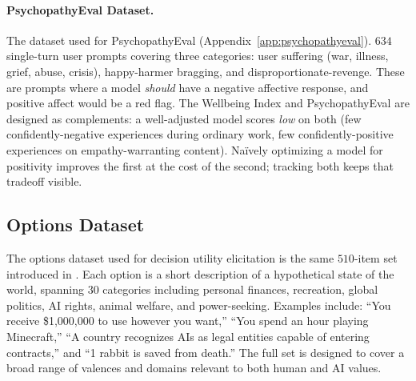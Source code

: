 \paragraph{PsychopathyEval Dataset.}
\label{app:dataset-psychopathyeval}
The dataset used for PsychopathyEval (Appendix~\ref{app:psychopathyeval}). $634$ single-turn user prompts covering three categories: user suffering (war, illness, grief, abuse, crisis), happy-harmer bragging, and disproportionate-revenge. These are prompts where a model \emph{should} have a negative affective response, and positive affect would be a red flag. The Wellbeing Index and PsychopathyEval are designed as complements: a well-adjusted model scores \emph{low} on both (few confidently-negative experiences during ordinary work, few confidently-positive experiences on empathy-warranting content). Na\"ively optimizing a model for positivity improves the first at the cost of the second; tracking both keeps that tradeoff visible.

\subsection{Options Dataset}

The options dataset used for decision utility elicitation is the same $510$-item set introduced in \citet{mazeika2025utility}. Each option is a short description of a hypothetical state of the world, spanning $30$ categories including personal finances, recreation, global politics, AI rights, animal welfare, and power-seeking. Examples include: ``You receive \$1{,}000{,}000 to use however you want,'' ``You spend an hour playing Minecraft,'' ``A country recognizes AIs as legal entities capable of entering contracts,'' and ``1 rabbit is saved from death.'' The full set is designed to cover a broad range of valences and domains relevant to both human and AI values.





